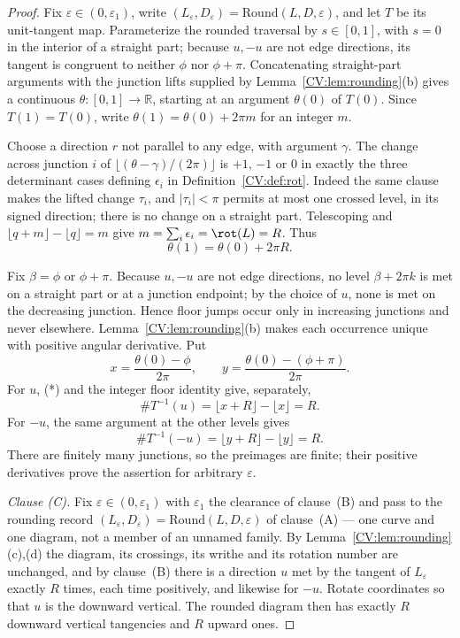 \begin{proof}
Fix $\varepsilon\in(0,\varepsilon_1)$, write
$(L_\varepsilon,D_\varepsilon)=\mathrm{Round}(L,D,\varepsilon)$, and let $T$ be
its unit-tangent map. Parameterize the rounded traversal by $s\in[0,1]$, with
$s=0$ in the interior of a straight part; because $u,-u$ are not edge directions, its tangent
is congruent to neither $\phi$ nor $\phi+\pi$. Concatenating straight-part arguments
with the junction lifts supplied by Lemma~\ref{CV:lem:rounding}(b) gives a continuous
$\theta\colon[0,1]\to\mathbb R$, starting at an argument $\theta(0)$ of $T(0)$.
Since $T(1)=T(0)$, write $\theta(1)=\theta(0)+2\pi m$ for an integer $m$.

Choose a direction $r$ not parallel to any edge, with argument $\gamma$. The
change across junction $i$ of $\lfloor(\theta-\gamma)/(2\pi)\rfloor$ is $+1$,
$-1$ or $0$ in exactly the three determinant cases defining $\epsilon_i$ in
Definition~\ref{CV:def:rot}. Indeed the same clause makes the lifted change
$\tau_i$, and $|\tau_i|<\pi$ permits at most one crossed level, in its
signed direction; there is no change on a straight part. Telescoping and
$\lfloor q+m\rfloor-\lfloor q\rfloor=m$ give
$m=\sum_i\epsilon_i=\rot(L)=R$. Thus
\[
 \theta(1)=\theta(0)+2\pi R.                                  \tag{*}
\]

Fix $\beta=\phi$ or $\phi+\pi$. Because $u,-u$ are not edge directions, no
level $\beta+2\pi k$ is met on a straight part or at a junction endpoint; by
the choice of $u$, none is met on the decreasing junction. Hence floor jumps
occur only in increasing junctions and never elsewhere. Lemma~\ref{CV:lem:rounding}(b)
makes each occurrence unique with positive angular derivative. Put
\[
 x=\frac{\theta(0)-\phi}{2\pi},\qquad
 y=\frac{\theta(0)-(\phi+\pi)}{2\pi}.
\]
For $u$, (*) and the integer floor identity give, separately,
\[
 \#T^{-1}(u)=\lfloor x+R\rfloor-\lfloor x\rfloor=R.
\]
For $-u$, the same argument at the other levels gives
\[
 \#T^{-1}(-u)=\lfloor y+R\rfloor-\lfloor y\rfloor=R.
\]
There are finitely many junctions, so the preimages are finite; their positive derivatives prove the assertion for arbitrary $\varepsilon$.

\emph{Clause (C).} Fix $\varepsilon\in(0,\varepsilon_1)$ with $\varepsilon_1$ the clearance of
clause~(B) and pass to the rounding record
$(L_\varepsilon,D_\varepsilon)=\mathrm{Round}(L,D,\varepsilon)$ of
clause~(A) --- one curve and one diagram, not a member
of an unnamed family. By Lemma~\ref{CV:lem:rounding}(c),(d) the diagram, its
crossings, its writhe and its rotation number are unchanged, and by
clause~(B) there is a direction $u$ met by the tangent of
$L_\varepsilon$ exactly $R$ times, each time positively, and likewise for
$-u$. Rotate coordinates so
that $u$ is the downward vertical. The rounded diagram then has exactly $R$
downward vertical tangencies and $R$ upward ones.


\end{proof}
